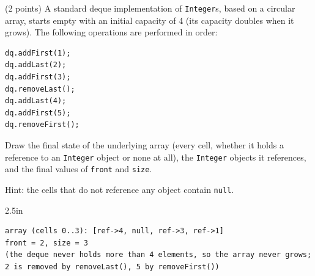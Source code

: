 \begin{question}
(2 points) A standard deque implementation of \lstinline|Integer|s, based on a circular array, starts empty with an initial capacity of 4 (its capacity doubles when it grows). The following operations are performed in order:

\begin{minipage}[t]{0.3\linewidth}
\vspace{-\baselineskip}
\begin{lstlisting}
dq.addFirst(1);
dq.addLast(2);
dq.addFirst(3);
dq.removeLast();
dq.addLast(4);
dq.addFirst(5);
dq.removeFirst();
\end{lstlisting}
\end{minipage}\hfill
\begin{minipage}[t]{0.66\linewidth}
Draw the final state of the underlying array (every cell, whether it holds a reference to an \lstinline|Integer| object or none at all), the \lstinline|Integer| objects it references, and the final values of \lstinline|front| and \lstinline|size|.

Hint: the cells that do not reference any object contain \lstinline|null|.
\end{minipage}

\begin{answerspace}{2.5in}
\ifanswers
\begin{verbatim}
array (cells 0..3): [ref->4, null, ref->3, ref->1]
front = 2, size = 3
(the deque never holds more than 4 elements, so the array never grows;
2 is removed by removeLast(), 5 by removeFirst())
\end{verbatim}
\fi
\end{answerspace}
\end{question}

